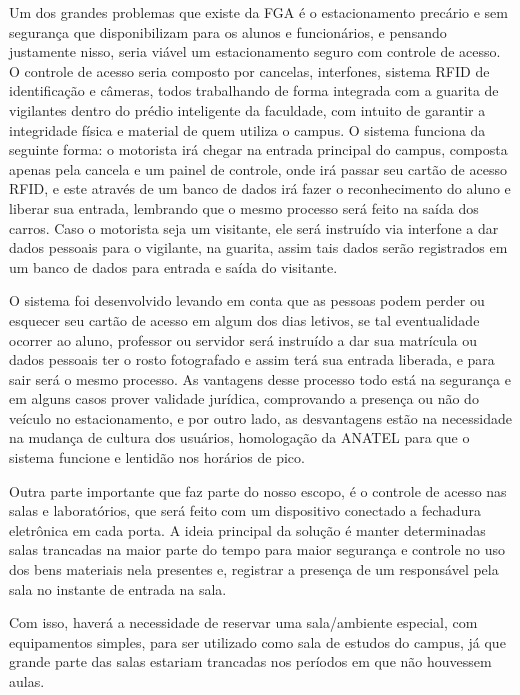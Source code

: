  Um dos grandes problemas que existe da FGA é o estacionamento precário e sem segurança que disponibilizam para os alunos e funcionários, e pensando justamente nisso, seria viável um estacionamento seguro com controle de acesso. O controle de acesso seria composto por cancelas, interfones, sistema RFID de identificação e câmeras, todos trabalhando de forma integrada com a guarita de vigilantes dentro do prédio inteligente da faculdade, com intuito de garantir a integridade física e material de quem utiliza o campus. O sistema funciona da seguinte forma: o motorista irá chegar na entrada principal do campus, composta apenas pela cancela e um painel de controle, onde irá passar seu cartão de acesso RFID, e este através de um banco de dados irá fazer o reconhecimento do aluno e liberar sua entrada, lembrando que o mesmo processo será feito na saída dos carros. Caso o motorista seja um visitante, ele será instruído via interfone a dar dados pessoais para o vigilante, na guarita, assim tais dados serão registrados em um banco de dados para entrada e saída do visitante.

O sistema foi desenvolvido levando em conta que as pessoas podem perder ou esquecer seu cartão de acesso em algum dos dias letivos, se tal eventualidade ocorrer ao aluno, professor ou servidor será instruído a dar sua matrícula ou dados pessoais ter o rosto fotografado e assim terá sua entrada liberada, e para sair será o mesmo processo. As vantagens desse processo todo está na segurança e em alguns casos prover validade jurídica, comprovando a presença ou não do veículo no estacionamento, e por outro lado, as desvantagens estão na necessidade na mudança de cultura dos usuários, homologação da ANATEL para que o sistema funcione e lentidão nos horários de pico.

Outra parte importante que faz parte do nosso escopo, é o controle de acesso nas salas e laboratórios, que será feito com um dispositivo conectado a fechadura eletrônica em cada porta. A ideia principal da solução é manter determinadas salas trancadas na maior parte do tempo para maior segurança e controle no uso dos bens materiais nela presentes e, registrar a presença de um responsável pela sala no instante de entrada na sala.

Com isso, haverá a necessidade de reservar uma sala/ambiente especial, com equipamentos simples, para ser utilizado como sala de estudos do campus, já que grande parte das salas estariam trancadas nos períodos em que não houvessem aulas.

